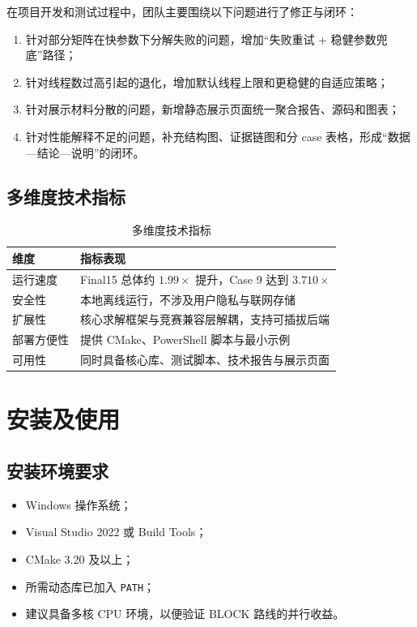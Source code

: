 \documentclass[12pt,a4paper,fontset=none]{ctexart}
\begin{document}
在项目开发和测试过程中，团队主要围绕以下问题进行了修正与闭环：
\begin{enumerate}
  \item 针对部分矩阵在快参数下分解失败的问题，增加“失败重试 + 稳健参数兜底”路径；
  \item 针对线程数过高引起的退化，增加默认线程上限和更稳健的自适应策略；
  \item 针对展示材料分散的问题，新增静态展示页面统一聚合报告、源码和图表；
  \item 针对性能解释不足的问题，补充结构图、证据链图和分 case 表格，形成“数据---结论---说明”的闭环。
\end{enumerate}

\subsection{多维度技术指标}

\begin{table}[H]
\centering
\caption{多维度技术指标}
\label{tab:metric}
\begin{tabular}{p{4cm}p{8cm}}
\toprule
维度 & 指标表现 \\
\midrule
运行速度 & Final15 总体约 $1.99\times$ 提升，Case 9 达到 $3.710\times$ \\
安全性 & 本地离线运行，不涉及用户隐私与联网存储 \\
扩展性 & 核心求解框架与竞赛兼容层解耦，支持可插拔后端 \\
部署方便性 & 提供 CMake、PowerShell 脚本与最小示例 \\
可用性 & 同时具备核心库、测试脚本、技术报告与展示页面 \\
\bottomrule
\end{tabular}
\end{table}

\section{安装及使用}

\subsection{安装环境要求}

\begin{itemize}
  \item Windows 操作系统；
  \item Visual Studio 2022 或 Build Tools；
  \item CMake 3.20 及以上；
  \item 所需动态库已加入 \texttt{PATH}；
  \item 建议具备多核 CPU 环境，以便验证 BLOCK 路线的并行收益。
\end{itemize}
\end{document}
